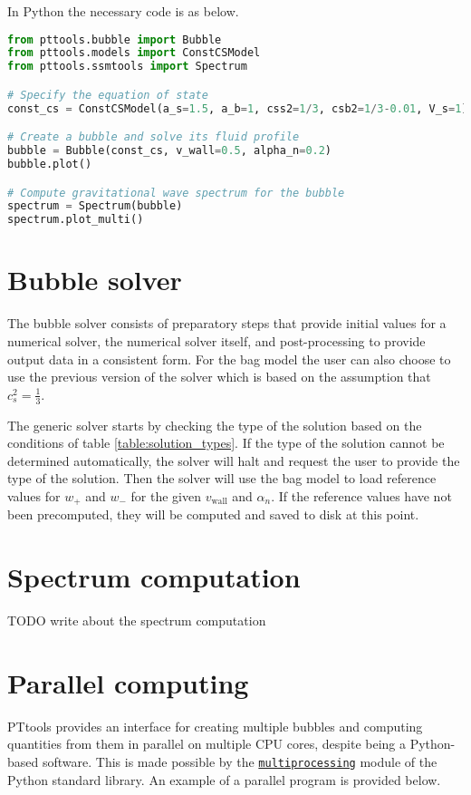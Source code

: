 In Python the necessary code is as below.
\begin{lstlisting}[language=Python]
from pttools.bubble import Bubble
from pttools.models import ConstCSModel
from pttools.ssmtools import Spectrum

# Specify the equation of state
const_cs = ConstCSModel(a_s=1.5, a_b=1, css2=1/3, csb2=1/3-0.01, V_s=1)

# Create a bubble and solve its fluid profile
bubble = Bubble(const_cs, v_wall=0.5, alpha_n=0.2)
bubble.plot()

# Compute gravitational wave spectrum for the bubble
spectrum = Spectrum(bubble)
spectrum.plot_multi()    
\end{lstlisting}


\section{Bubble solver}
The bubble solver consists of preparatory steps that provide initial values for a numerical solver, the numerical solver itself, and post-processing to provide output data in a consistent form.
For the bag model the user can also choose to use the previous version of the solver which is based on the assumption that $c_s^2 = \frac{1}{3}$.

The generic solver starts by checking the type of the solution based on the conditions of table \ref{table:solution_types}.
If the type of the solution cannot be determined automatically, the solver will halt and request the user to provide the type of the solution.
Then the solver will use the bag model to load reference values for $w_+$ and $w_-$ for the given $v_\text{wall}$ and $\alpha_n$.
If the reference values have not been precomputed, they will be computed and saved to disk at this point.



\section{Spectrum computation}
TODO write about the spectrum computation


\section{Parallel computing}
PTtools provides an interface for creating multiple bubbles and computing quantities from them in parallel on multiple CPU cores, despite being a Python-based software.
This is made possible by the
\href{https://docs.python.org/3/library/multiprocessing.html}{\texttt{multiprocessing}}
module of the Python standard library.
An example of a parallel program is provided below.

